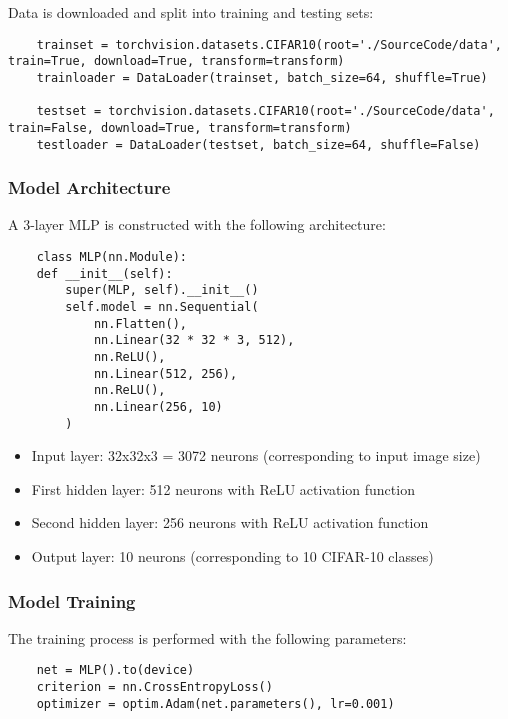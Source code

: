 \documentclass[12pt]{article}
\begin{document}
Data is downloaded and split into training and testing sets:

\begin{verbatim}
    trainset = torchvision.datasets.CIFAR10(root='./SourceCode/data', train=True, download=True, transform=transform)
    trainloader = DataLoader(trainset, batch_size=64, shuffle=True)

    testset = torchvision.datasets.CIFAR10(root='./SourceCode/data', train=False, download=True, transform=transform)
    testloader = DataLoader(testset, batch_size=64, shuffle=False)
\end{verbatim}

\subsubsection{Model Architecture}

A 3-layer MLP is constructed with the following architecture:

\begin{verbatim}
    class MLP(nn.Module):
    def __init__(self):
        super(MLP, self).__init__()
        self.model = nn.Sequential(
            nn.Flatten(),
            nn.Linear(32 * 32 * 3, 512),
            nn.ReLU(),
            nn.Linear(512, 256),
            nn.ReLU(),
            nn.Linear(256, 10)
        )
\end{verbatim}

\begin{itemize}
    \item Input layer: 32x32x3 = 3072 neurons (corresponding to input image size)
    \item First hidden layer: 512 neurons with ReLU activation function
    \item Second hidden layer: 256 neurons with ReLU activation function
    \item Output layer: 10 neurons (corresponding to 10 CIFAR-10 classes)
\end{itemize}

\subsubsection{Model Training}

The training process is performed with the following parameters:

\begin{verbatim}
    net = MLP().to(device)
    criterion = nn.CrossEntropyLoss()
    optimizer = optim.Adam(net.parameters(), lr=0.001)
\end{verbatim}
\end{document}
